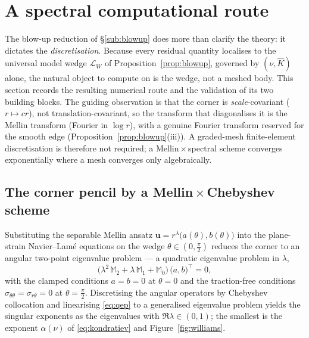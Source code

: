 \section{A spectral computational route}
\label{sec:numerical}

The blow-up reduction of \S\ref{sub:blowup} does more than clarify the theory: it dictates the \emph{discretisation}.
Because every residual quantity localises to the universal model wedge $\mathcal{L}_W$ of Proposition~\ref{prop:blowup},
governed by $(\nu,\hat K)$ alone, the natural object to compute on is the wedge, not a meshed body. This section records
the resulting numerical route and the validation of its two building blocks. The guiding observation is that the corner
is \emph{scale}-covariant ($r\mapsto cr$), not translation-covariant, so the transform that diagonalises it is the
Mellin transform (Fourier in $\log r$), with a genuine Fourier transform reserved for the smooth edge
(Proposition~\ref{prop:blowup}(iii)). A graded-mesh finite-element discretisation is therefore not required; a
Mellin\,$\times$\,spectral scheme converges exponentially where a mesh converges only algebraically.

\subsection{The corner pencil by a Mellin\,\texorpdfstring{$\times$}{x}\,Chebyshev scheme}
\label{sub:numpencil}

Substituting the separable Mellin ansatz $\bm{u}=r^{\lambda}\big(a(\theta),b(\theta)\big)$ into the plane-strain
Navier--Lam\'e equations on the wedge $\theta\in(0,\tfrac\pi2)$ reduces the corner to an angular two-point eigenvalue
problem --- a quadratic eigenvalue problem in $\lambda$,
\begin{equation}
    \label{eq:qep}
    \big(\lambda^2\,\mathbb{M}_2+\lambda\,\mathbb{M}_1+\mathbb{M}_0\big)\,\big(a,b\big)^{\!\top}=0,
\end{equation}
with the clamped conditions $a=b=0$ at $\theta=0$ and the traction-free conditions $\sigma_{\theta\theta}=\sigma_{r\theta}=0$
at $\theta=\tfrac\pi2$. Discretising the angular operators by Chebyshev collocation and linearising \eqref{eq:qep} to a
generalised eigenvalue problem yields the singular exponents as the eigenvalues with $\Re\lambda\in(0,1)$; the smallest is
the exponent $\alpha(\nu)$ of \eqref{eq:kondratiev} and Figure~\ref{fig:williams}.

